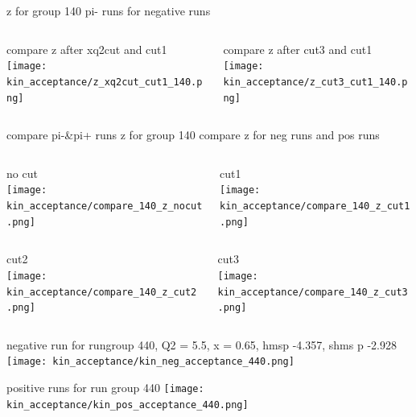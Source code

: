 \documentclass[aspectratio=169,xcolor=dvipsnames]{beamer}
\begin{document}
\begin{frame}{z for group 140 pi- runs}
  for negative runs
  \begin{columns}
    \begin{column}[T]{0.5\textwidth}
      compare z after xq2cut and cut1
      \texttt{[image: kin\_acceptance/z\_xq2cut\_cut1\_140.png]}
\end{column}
\begin{column}[T]{0.5\textwidth}
  compare z after cut3 and cut1
  \texttt{[image: kin\_acceptance/z\_cut3\_cut1\_140.png]}
\end{column}
\end{columns}
\end{frame}

\begin{frame}{compare pi-&pi+ runs z for group 140}
      compare z for neg runs and pos runs
  \begin{columns}
    \begin{column}[T]{0.5\textwidth}
      no cut\\
      \texttt{[image: kin\_acceptance/compare\_140\_z\_nocut.png]}
\end{column}
\begin{column}[T]{0.5\textwidth}
       cut1\\
  \texttt{[image: kin\_acceptance/compare\_140\_z\_cut1.png]}
\end{column}
\end{columns}
  \begin{columns}
    \begin{column}[T]{0.5\textwidth}
       cut2\\
  \texttt{[image: kin\_acceptance/compare\_140\_z\_cut2.png]}
\end{column}
\begin{column}[T]{0.5\textwidth}
       cut3\\
  \texttt{[image: kin\_acceptance/compare\_140\_z\_cut3.png]}
\end{column}
\end{columns}
\end{frame}

\begin{frame}
  negative run for rungroup 440, Q2 = 5.5, x = 0.65, hmsp -4.357, shms p -2.928
  \texttt{[image: kin\_acceptance/kin\_neg\_acceptance\_440.png]}
\end{frame}

\begin{frame}
  positive runs for run group 440
  \texttt{[image: kin\_acceptance/kin\_pos\_acceptance\_440.png]}
\end{frame}
\end{document}
